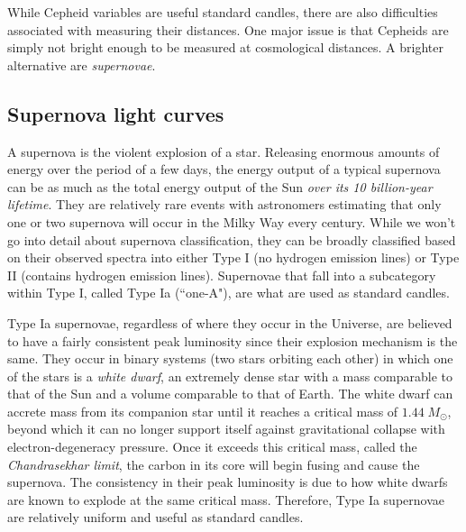 \documentclass[11pt]{article}
\begin{document}

While Cepheid variables are useful standard candles, there are also difficulties associated with measuring their distances. One major issue is that Cepheids are simply not bright enough to be measured at cosmological distances. A brighter alternative are \emph{supernovae}.

\subsection{Supernova light curves}

A supernova is the violent explosion of a star. Releasing enormous amounts of energy over the period of a few days, the energy output of a typical supernova can be as much as the total energy output of the Sun \textsl{over its 10 billion-year lifetime}. They are relatively rare events with astronomers estimating that only one or two supernova will occur in the Milky Way every century. While we won't go into detail about supernova classification, they can be broadly classified based on their observed spectra into either Type I (no hydrogen emission lines) or Type II (contains hydrogen emission lines). Supernovae that fall into a subcategory within Type I, called Type Ia (``one-A"), are what are used as standard candles.

Type Ia supernovae, regardless of where they occur in the Universe, are believed to have a fairly consistent peak luminosity since their explosion mechanism is the same. They occur in binary systems (two stars orbiting each other) in which one of the stars is a \textsl{white dwarf}, an extremely dense star with a mass comparable to that of the Sun and a volume comparable to that of Earth. The white dwarf can accrete mass from its companion star until it reaches a critical mass of $1.44\;M_\odot$, beyond which it can no longer support itself against gravitational collapse with electron-degeneracy pressure. Once it exceeds this critical mass, called the \textsl{Chandrasekhar limit}, the carbon in its core will begin fusing and cause the supernova. The consistency in their peak luminosity is due to how white dwarfs are known to explode at the same critical mass. Therefore, Type Ia supernovae are relatively uniform and useful as standard candles.
\end{document}
